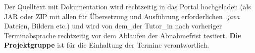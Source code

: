 Der Quelltext mit Dokumentation wird rechtzeitig in das Portal hochgeladen (als JAR oder ZIP  mit allen für Übersetzung und Ausführung 
erforderlichen \emph{.java} Dateien, Bildern etc.) und wird von dem\_der Tutor\_in nach vorheriger Terminabsprache rechtzeitig vor
dem Ablaufen der Abnahmefrist testiert. \textbf{Die Projektgruppe} ist für die Einhaltung der Termine verantwortlich.
